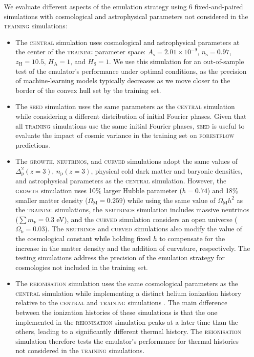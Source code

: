 \documentclass{aa}
\newcommand{\forestflow}{\textsc{forestflow}\xspace}
\newcommand{\lacehc}{\textsc{training}\xspace}
\newcommand{\simseed}{\textsc{seed}\xspace}
\newcommand{\simigm}{\textsc{reionisation}\xspace}
\newcommand{\simcurved}{\textsc{curved}\xspace}
\newcommand{\simh}{\textsc{growth}\xspace}
\newcommand{\simnu}{\textsc{neutrinos}\xspace}
\newcommand{\simcentral}{\textsc{central}\xspace}
\begin{document}
We evaluate different aspects of the emulation strategy using 6 fixed-and-paired simulations with cosmological and astrophysical parameters not considered in the \lacehc simulations:
%
\begin{itemize}
    \item The \simcentral simulation uses cosmological and astrophysical parameters at the center of the \lacehc parameter space: $A_\mathrm{s}=2.01\times10^{-9}$, $n_\mathrm{s}=0.97$, $z_\mathrm{H}=10.5$, $H_\mathrm{A}=1$, and $H_\mathrm{S}=1$. We use this simulation for an out-of-sample test of the emulator's performance under optimal conditions, as the precision of machine-learning models typically decreases as we move closer to the border of the convex hull set by the training set.
    
    \item The \simseed simulation uses the same parameters as the \simcentral simulation while considering a different distribution of initial Fourier phases. Given that all \lacehc simulations use the same initial Fourier phases, \simseed is useful to evaluate the impact of cosmic variance in the training set on \forestflow predictions.
    
    \item The \simh, \simnu, and \simcurved simulations adopt the same values of $\Delta^2_\mathrm{p}(z=3)$, $n_\mathrm{p}(z=3)$, physical cold dark matter and baryonic densities, and astrophysical parameters as the \simcentral simulation. However, the \simh simulation uses 10\% larger Hubble parameter ($h=0.74$) and 18\% smaller matter density ($\Omega_\mathrm{M}=0.259$) while using the same value of $\Omega_\mathrm{M} h^2$ as the \lacehc simulations, the \simnu simulation includes massive neutrinos ($\sum m_\nu=0.3$ eV), and the \simcurved simulation considers an open universe ($\Omega_k=0.03$). The \simnu and \simcurved simulations also modify the value of the cosmological constant while holding fixed $h$ to compensate for the increase in the matter density and the addition of curvature, respectively. The testing simulations address the precision of the emulation strategy for cosmologies not included in the training set.

    \item The \simigm simulation uses the same cosmological parameters as the \simcentral simulation while implementing a distinct helium ionization history relative to the \simcentral and \lacehc simulations \citep{puchwein2019ConsistentModellingMetagalactic}. The main difference between the ionization histories of these simulations is that the one implemented in the \simigm simulation peaks at a later time than the others, leading to a significantly different thermal history. The \simigm simulation therefore tests the emulator's performance for thermal histories not considered in the \lacehc simulations.
\end{itemize}
\end{document}
